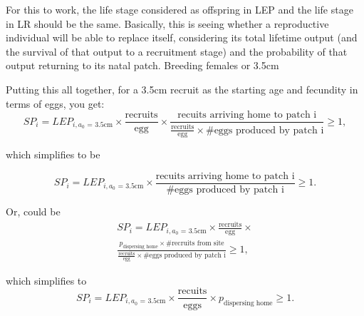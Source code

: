 \documentclass[12pt, oneside]{article}   	%
\begin{document}
For this to work, the life stage considered as offspring in LEP and the life stage in LR should be the same. Basically, this is seeing whether a reproductive individual will be able to replace itself, considering its total lifetime output (and the survival of that output to a recruitment stage) and the probability of that output returning to its natal patch. Breeding females or 3.5cm 

Putting this all together, for a 3.5cm recruit as the starting age and fecundity in terms of eggs, you get:
\begin{equation}
SP_i = LEP_{i, \text{$a_0$ = 3.5cm}} \times \frac{\text{recruits}}{\text{egg}} \times \frac{\text{recuits arriving home to patch i}}{\frac{\text{recruits}}{\text{egg}} \times \# \text{eggs produced by patch i}} \geq 1, 
\end{equation}

which simplifies to be

\begin{equation}
SP_i = LEP_{i, \text{$a_0$ = 3.5cm}} \times \frac{\text{recuits arriving home to patch i}}{\# \text{eggs produced by patch i}} \geq 1. %
\end{equation}

Or, could be
\begin{multline}
SP_i = LEP_{i, \text{$a_0$ = 3.5cm}} \times \frac{\text{recruits}}{\text{egg}} \times \\ \frac{p_{\text{dispersing home}} \times \text{\# recruits from site}}{\frac{\text{recruits}}{\text{egg}} \times \# \text{eggs produced by patch i}} \geq 1, 
\end{multline}

which simplifies to
\begin{equation}
SP_i = LEP_{i, \text{$a_0$ = 3.5cm}} \times \frac{\text{recuits}}{\text{eggs}} \times p_{\text{dispersing home}} \geq 1. %
\end{equation}
\end{document}
